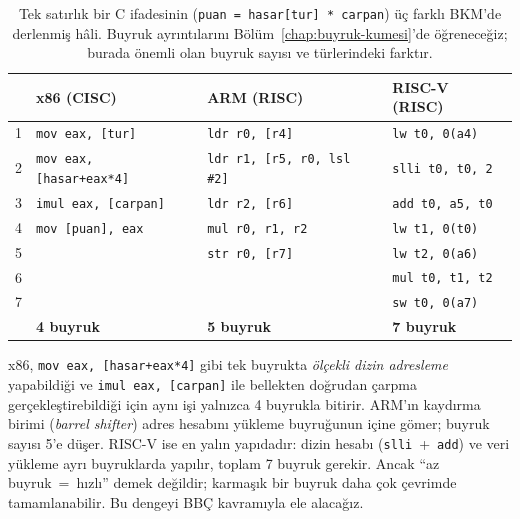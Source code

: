 \begin{table}[H]
\centering
\caption[Aynı C kodunun üç farklı BKM'de derlenmesi]{Tek satırlık bir C ifadesinin (\texttt{puan = hasar[tur] * carpan}) üç farklı BKM'de derlenmiş hâli. Buyruk ayrıntılarını Bölüm~\ref{chap:buyruk-kumesi}'de öğreneceğiz; burada önemli olan buyruk sayısı ve türlerindeki farktır.}
\label{tab:buyruk-karsilastirma}
\small
\begin{tabular}{@{}c@{\quad}l@{\qquad}l@{\qquad}l@{}}
\toprule
 & \textbf{x86 (CISC)} & \textbf{ARM (RISC)} & \textbf{RISC-V (RISC)} \\
\midrule
1 & \texttt{mov eax, [tur]}          & \texttt{ldr r0, [r4]}             & \texttt{lw t0, 0(a4)} \\
2 & \texttt{mov eax, [hasar+eax*4]}  & \texttt{ldr r1, [r5, r0, lsl \#2]} & \texttt{slli t0, t0, 2} \\
3 & \texttt{imul eax, [carpan]}      & \texttt{ldr r2, [r6]}             & \texttt{add t0, a5, t0} \\
4 & \texttt{mov [puan], eax}         & \texttt{mul r0, r1, r2}           & \texttt{lw t1, 0(t0)} \\
5 &                                  & \texttt{str r0, [r7]}             & \texttt{lw t2, 0(a6)} \\
6 &                                  &                                   & \texttt{mul t0, t1, t2} \\
7 &                                  &                                   & \texttt{sw t0, 0(a7)} \\
\midrule
  & \textbf{4 buyruk}                & \textbf{5 buyruk}                 & \textbf{7 buyruk} \\
\bottomrule
\end{tabular}
\end{table}

x86, \texttt{mov eax, [hasar+eax*4]} gibi tek buyrukta \emph{ölçekli dizin adresleme} yapabildiği ve \texttt{imul eax, [carpan]} ile bellekten doğrudan çarpma gerçekleştirebildiği için aynı işi yalnızca 4 buyrukla bitirir. ARM'ın kaydırma birimi (\emph{barrel shifter}) adres hesabını yükleme buyruğunun içine gömer; buyruk sayısı 5'e düşer. RISC-V ise en yalın yapıdadır: dizin hesabı (\texttt{slli}~+~\texttt{add}) ve veri yükleme ayrı buyruklarda yapılır, toplam 7 buyruk gerekir. Ancak ``az buyruk~=~hızlı'' demek değildir; karmaşık bir buyruk daha çok çevrimde tamamlanabilir. Bu dengeyi BBÇ kavramıyla ele alacağız.

